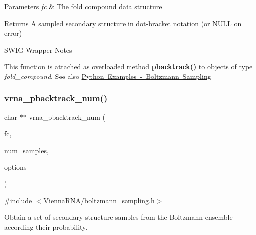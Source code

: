 \begin{DoxyParams}{Parameters}
{\em fc} & The fold compound data structure \\
\hline
\end{DoxyParams}
\begin{DoxyReturn}{Returns}
A sampled secondary structure in dot-\/bracket notation (or N\+U\+LL on error)
\end{DoxyReturn}
\begin{DoxyRefDesc}{S\+W\+I\+G Wrapper Notes}
\item[\mbox{\hyperlink{wrappers__wrappers000006}{S\+W\+I\+G Wrapper Notes}}]This function is attached as overloaded method {\bfseries{\mbox{\hyperlink{group__subopt__stochbt__deprecated_gac03ca6db186bb3bf0a2a326d7fb3ba03}{pbacktrack()}}}} to objects of type {\itshape fold\+\_\+compound}. See also \mbox{\hyperlink{examples_python_examples_python_pbacktrack}{Python Examples -\/ Boltzmann Sampling}} \end{DoxyRefDesc}
\mbox{\label{group__subopt__stochbt_ga596ed9bcd86f629a7c7c59c58b297db5}} 
\subsubsection{\texorpdfstring{vrna\_pbacktrack\_num()}{vrna\_pbacktrack\_num()}}
{\footnotesize\ttfamily char $\ast$$\ast$ vrna\+\_\+pbacktrack\+\_\+num (\begin{DoxyParamCaption}\item[{\mbox{\hyperlink{group__fold__compound_ga1b0cef17fd40466cef5968eaeeff6166}{vrna\+\_\+fold\+\_\+compound\+\_\+t}} $\ast$}]{fc,  }\item[{unsigned int}]{num\+\_\+samples,  }\item[{unsigned int}]{options }\end{DoxyParamCaption})}



{\ttfamily \#include $<$\mbox{\hyperlink{boltzmann__sampling_8h}{Vienna\+R\+N\+A/boltzmann\+\_\+sampling.\+h}}$>$}



Obtain a set of secondary structure samples from the Boltzmann ensemble according their probability. 

